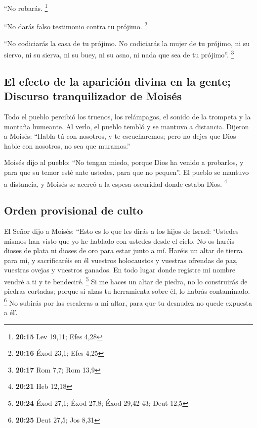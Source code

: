 \begin{paracol}{2}
 ``No robarás. \footnote{\textbf{20:15} Lev 19,11; Efes
  4,28}

 ``No darás falso testimonio contra tu prójimo.
\footnote{\textbf{20:16} Éxod 23,1; Efes 4,25}

 ``No codiciarás la casa de tu prójimo. No codiciarás la
mujer de tu prójimo, ni su siervo, ni su sierva, ni su buey, ni su asno,
ni nada que sea de tu prójimo''. \footnote{\textbf{20:17} Rom 7,7; Rom
  13,9}

\hypertarget{el-efecto-de-la-apariciuxf3n-divina-en-la-gente-discurso-tranquilizador-de-moisuxe9s}{%
\subsection{El efecto de la aparición divina en la gente; Discurso
tranquilizador de
Moisés}\label{el-efecto-de-la-apariciuxf3n-divina-en-la-gente-discurso-tranquilizador-de-moisuxe9s}}

 Todo el pueblo percibió los truenos, los relámpagos, el
sonido de la trompeta y la montaña humeante. Al verlo, el pueblo tembló
y se mantuvo a distancia.  Dijeron a Moisés: ``Habla tú
con nosotros, y te escucharemos; pero no dejes que Dios hable con
nosotros, no sea que muramos.''

 Moisés dijo al pueblo: ``No tengan miedo, porque Dios ha
venido a probarlos, y para que su temor esté ante ustedes, para que no
pequen''.  El pueblo se mantuvo a distancia, y Moisés se
acercó a la espesa oscuridad donde estaba Dios. \footnote{\textbf{20:21}
  Heb 12,18}

\hypertarget{orden-provisional-de-culto}{%
\subsection{Orden provisional de
culto}\label{orden-provisional-de-culto}}

 El Señor dijo a Moisés: ``Esto es lo que les dirás a los
hijos de Israel: `Ustedes mismos han visto que yo he hablado con ustedes
desde el cielo.  No os haréis dioses de plata ni dioses
de oro para estar junto a mí.  Haréis un altar de tierra
para mí, y sacrificaréis en él vuestros holocaustos y vuestras ofrendas
de paz, vuestras ovejas y vuestros ganados. En todo lugar donde registre
mi nombre vendré a ti y te bendeciré. \footnote{\textbf{20:24} Éxod
  27,1; Éxod 27,8; Éxod 29,42-43; Deut 12,5}  Si me haces
un altar de piedra, no lo construirás de piedras cortadas; porque si
alzas tu herramienta sobre él, lo habrás contaminado. \footnote{\textbf{20:25}
  Deut 27,5; Jos 8,31}  No subirás por las escaleras a mi
altar, para que tu desnudez no quede expuesta a él'.


\end{paracol}
